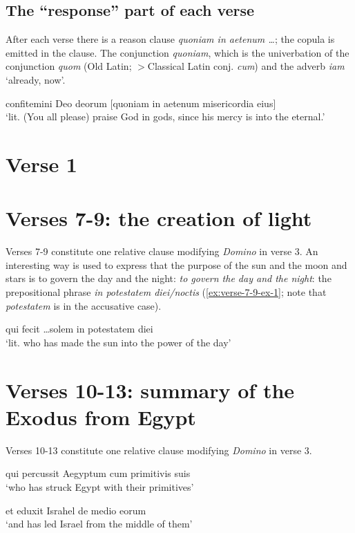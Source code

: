 \documentclass[a4paper, 12pt]{article}
\newcommand{\form}[1]{\emph{#1}}
\newcommand{\translate}[1]{`#1'}
\newcommand*{\changeto}{$>$}
\begin{document}
\subsection{The ``response'' part of each verse}

After each verse there is a reason clause \form{quoniam in aetenum \dots};
the copula is emitted in the clause.
The conjunction \form{quoniam}, 
which is the univerbation of 
the conjunction \form{quom} (Old Latin; \changeto Classical Latin conj. \form{cum})
and the adverb \form{iam} \translate{already, now}.

\begin{exe}
    \ex\label{ex:verse-2-ex-1} confitemini Deo deorum [quoniam in aetenum misericordia eius]  \\ 
    \translate{lit. (You all please) praise God in gods, since his mercy is into the eternal.}
\end{exe}

\section{Verse 1}

\section{Verses 7-9: the creation of light}

Verses 7-9 constitute one relative clause modifying \form{Domino} in verse 3.
An interesting way is used to express 
that the purpose of the sun and the moon and stars 
is to govern the day and the night: 
\emph{to govern the day and the night}:
the prepositional phrase \form{in potestatem diei/noctis}
(\ref{ex:verse-7-9-ex-1}; note that \form{potestatem} is in the accusative case).


\begin{exe}
    \ex\label{ex:verse-7-9-ex-1} qui fecit \dots solem in potestatem diei \\ 
    \translate{lit. who has made the sun into the power of the day}
\end{exe}

\section{Verses 10-13: summary of the Exodus from Egypt}

Verses 10-13 constitute one relative clause modifying \form{Domino} in verse 3.


\begin{exe}
    \ex qui percussit Aegyptum cum primitivis suis \\
    \translate{who has struck Egypt with their primitives}

    \ex et eduxit Israhel de medio eorum \\
    \translate{and has led Israel from the middle of them} \\

\end{exe}
\end{document}

